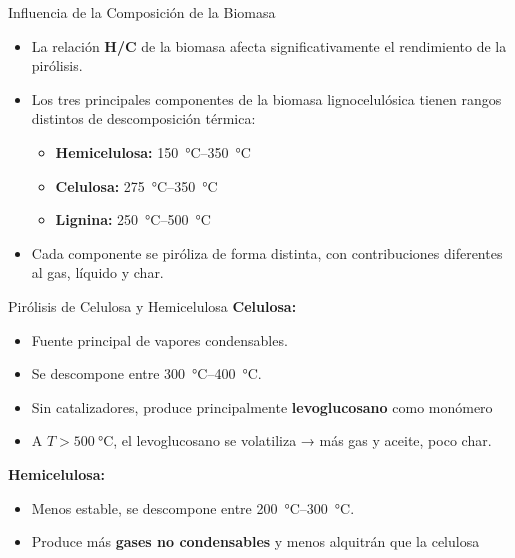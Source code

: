 \documentclass[../../main.tex]{subfiles}
\begin{document}
\begin{frame}{Influencia de la Composición de la Biomasa}
\small
\begin{itemize}
  \item La relación \textbf{H/C} de la biomasa afecta significativamente el rendimiento de la pirólisis.
  \item Los tres principales componentes de la biomasa lignocelulósica tienen rangos distintos de descomposición térmica:
  \begin{itemize}
    \item \textbf{Hemicelulosa:} \SI{150}{\degreeCelsius}–\SI{350}{\degreeCelsius}
    \item \textbf{Celulosa:} \SI{275}{\degreeCelsius}–\SI{350}{\degreeCelsius}
    \item \textbf{Lignina:} \SI{250}{\degreeCelsius}–\SI{500}{\degreeCelsius}
  \end{itemize}
  \item Cada componente se piróliza de forma distinta, con contribuciones diferentes al gas, líquido y char.
\end{itemize}
\end{frame}

\begin{frame}{Pirólisis de Celulosa y Hemicelulosa}
\small
\textbf{Celulosa:}
\begin{itemize}
  \item Fuente principal de vapores condensables.
  \item Se descompone entre \SI{300}{\degreeCelsius}–\SI{400}{\degreeCelsius}.
  \item Sin catalizadores, produce principalmente \textbf{levoglucosano} como monómero %
  \item A $T > \SI{500}{\degreeCelsius}$, el levoglucosano se volatiliza → más gas y aceite, poco char.
\end{itemize}

\vspace{0.3cm}
\textbf{Hemicelulosa:}
\begin{itemize}
  \item Menos estable, se descompone entre \SI{200}{\degreeCelsius}–\SI{300}{\degreeCelsius}.
  \item Produce más \textbf{gases no condensables} y menos alquitrán que la celulosa %
\end{itemize}
\end{frame}
\end{document}
